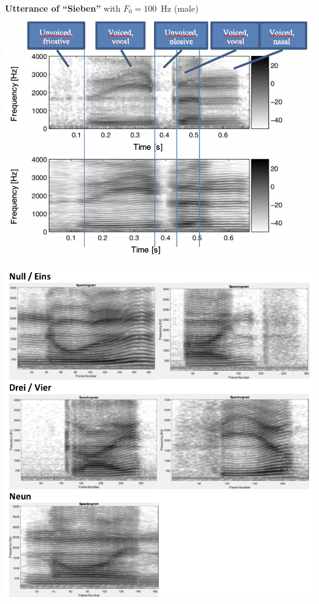 \begin{minipage}[]{0.49\textwidth}
\centering
\textbf{Utterance of ``Sieben''} with \(F_0=100\)~Hz (male)
\includegraphics[width=\linewidth]{img/spectrogram_sieben}
\end{minipage}
\hfill
\begin{minipage}[]{0.4\textwidth}
\centering
\includegraphics[width=\linewidth]{img/german_digits}
\end{minipage}


